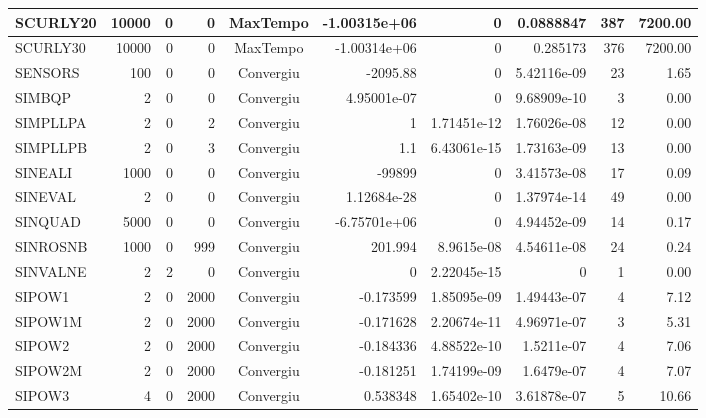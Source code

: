\begin{center}
\begin{longtable}{|l|r|r|r|c|r|r|r|r|r|}
SCURLY20 &  10000 &      0 &      0 & MaxTempo   & -1.00315e+06 &              0 &   0.0888847 &    387 & 7200.00 \\ \hline
SCURLY30 &  10000 &      0 &      0 & MaxTempo   & -1.00314e+06 &              0 &    0.285173 &    376 & 7200.00 \\ \hline
 SENSORS &    100 &      0 &      0 & Convergiu  &    -2095.88 &              0 & 5.42116e-09 &     23 &    1.65 \\ \hline
  SIMBQP &      2 &      0 &      0 & Convergiu  & 4.95001e-07 &              0 & 9.68909e-10 &      3 &    0.00 \\ \hline
SIMPLLPA &      2 &      0 &      2 & Convergiu  &           1 &    1.71451e-12 & 1.76026e-08 &     12 &    0.00 \\ \hline
SIMPLLPB &      2 &      0 &      3 & Convergiu  &         1.1 &    6.43061e-15 & 1.73163e-09 &     13 &    0.00 \\ \hline
 SINEALI &   1000 &      0 &      0 & Convergiu  &      -99899 &              0 & 3.41573e-08 &     17 &    0.09 \\ \hline
 SINEVAL &      2 &      0 &      0 & Convergiu  & 1.12684e-28 &              0 & 1.37974e-14 &     49 &    0.00 \\ \hline
 SINQUAD &   5000 &      0 &      0 & Convergiu  & -6.75701e+06 &              0 & 4.94452e-09 &     14 &    0.17 \\ \hline
SINROSNB &   1000 &      0 &    999 & Convergiu  &     201.994 &     8.9615e-08 & 4.54611e-08 &     24 &    0.24 \\ \hline
SINVALNE &      2 &      2 &      0 & Convergiu  &           0 &    2.22045e-15 &           0 &      1 &    0.00 \\ \hline
  SIPOW1 &      2 &      0 &   2000 & Convergiu  &   -0.173599 &    1.85095e-09 & 1.49443e-07 &      4 &    7.12 \\ \hline
 SIPOW1M &      2 &      0 &   2000 & Convergiu  &   -0.171628 &    2.20674e-11 & 4.96971e-07 &      3 &    5.31 \\ \hline
  SIPOW2 &      2 &      0 &   2000 & Convergiu  &   -0.184336 &    4.88522e-10 &  1.5211e-07 &      4 &    7.06 \\ \hline
 SIPOW2M &      2 &      0 &   2000 & Convergiu  &   -0.181251 &    1.74199e-09 &  1.6479e-07 &      4 &    7.07 \\ \hline
  SIPOW3 &      4 &      0 &   2000 & Convergiu  &    0.538348 &    1.65402e-10 & 3.61878e-07 &      5 &   10.66 \\ \hline

\end{longtable}
\end{center}
